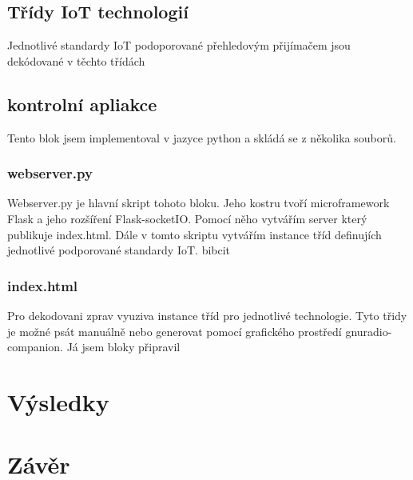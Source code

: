 \documentclass{ctuthesis}
\begin{document}
\section{Třídy IoT technologií}
Jednotlivé standardy IoT podoporované přehledovým přijímačem jsou dekódované v těchto třídách 
\section{kontrolní apliakce}
Tento blok jsem implementoval v jazyce python a skládá se z několika souborů.
\subsection{webserver.py}
Webserver.py je hlavní skript tohoto bloku. Jeho kostru tvoří microframework Flask a jeho rozšíření Flask-socketIO. Pomocí něho vytvářím server který publikuje index.html. Dále v tomto skriptu vytvářím instance tříd definujích jednotlivé podporované standardy IoT. bibcit
\subsection{index.html}


 Pro dekodovani zprav vyuziva instance tříd  pro jednotlivé technologie. Tyto třidy je možné psát manuálně nebo generovat pomocí grafického prostředí gnuradio-companion. Já jsem bloky připravil 



\chapter{Výsledky}
\chapter{Závěr}


\printbibliography
\end{document}
